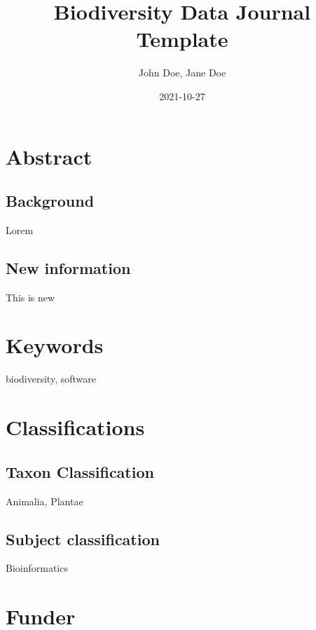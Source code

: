 \documentclass[
]{article}
\title{Biodiversity Data Journal Template}
\author{John Doe, Jane Doe}
\date{2021-10-27}
\begin{document}
\maketitle

\hypertarget{abstract}{%
\section{Abstract}\label{abstract}}

\hypertarget{background}{%
\subsection{Background}\label{background}}

Lorem

\hypertarget{new-information}{%
\subsection{New information}\label{new-information}}

This is new

\hypertarget{keywords}{%
\section{Keywords}\label{keywords}}

biodiversity, software

\hypertarget{classifications}{%
\section{Classifications}\label{classifications}}

\hypertarget{taxon-classification}{%
\subsection{Taxon Classification}\label{taxon-classification}}

Animalia, Plantae

\hypertarget{subject-classification}{%
\subsection{Subject classification}\label{subject-classification}}

Bioinformatics

\hypertarget{funder}{%
\section{Funder}\label{funder}}
\end{document}
